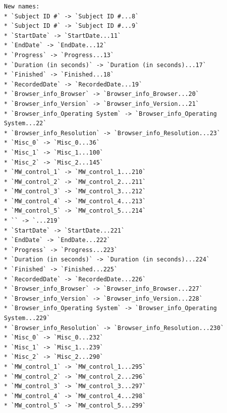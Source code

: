 \documentclass[
  letterpaper,
  DIV=11,
  numbers=noendperiod]{scrartcl}
\newenvironment{Shaded}{\begin{snugshade}}{\end{snugshade}}
\newcommand{\AttributeTok}[1]{\textcolor[rgb]{0.40,0.45,0.13}{#1}}
\newcommand{\DecValTok}[1]{\textcolor[rgb]{0.68,0.00,0.00}{#1}}
\newcommand{\FunctionTok}[1]{\textcolor[rgb]{0.28,0.35,0.67}{#1}}
\newcommand{\NormalTok}[1]{\textcolor[rgb]{0.00,0.23,0.31}{#1}}
\newcommand{\OtherTok}[1]{\textcolor[rgb]{0.00,0.23,0.31}{#1}}
\newcommand{\SpecialCharTok}[1]{\textcolor[rgb]{0.37,0.37,0.37}{#1}}
\newcommand{\StringTok}[1]{\textcolor[rgb]{0.13,0.47,0.30}{#1}}
\begin{document}
\begin{verbatim}
New names:
* `Subject ID #` -> `Subject ID #...8`
* `Subject ID #` -> `Subject ID #...9`
* `StartDate` -> `StartDate...11`
* `EndDate` -> `EndDate...12`
* `Progress` -> `Progress...13`
* `Duration (in seconds)` -> `Duration (in seconds)...17`
* `Finished` -> `Finished...18`
* `RecordedDate` -> `RecordedDate...19`
* `Browser_info_Browser` -> `Browser_info_Browser...20`
* `Browser_info_Version` -> `Browser_info_Version...21`
* `Browser_info_Operating System` -> `Browser_info_Operating System...22`
* `Browser_info_Resolution` -> `Browser_info_Resolution...23`
* `Misc_0` -> `Misc_0...36`
* `Misc_1` -> `Misc_1...100`
* `Misc_2` -> `Misc_2...145`
* `MW_control_1` -> `MW_control_1...210`
* `MW_control_2` -> `MW_control_2...211`
* `MW_control_3` -> `MW_control_3...212`
* `MW_control_4` -> `MW_control_4...213`
* `MW_control_5` -> `MW_control_5...214`
* `` -> `...219`
* `StartDate` -> `StartDate...221`
* `EndDate` -> `EndDate...222`
* `Progress` -> `Progress...223`
* `Duration (in seconds)` -> `Duration (in seconds)...224`
* `Finished` -> `Finished...225`
* `RecordedDate` -> `RecordedDate...226`
* `Browser_info_Browser` -> `Browser_info_Browser...227`
* `Browser_info_Version` -> `Browser_info_Version...228`
* `Browser_info_Operating System` -> `Browser_info_Operating System...229`
* `Browser_info_Resolution` -> `Browser_info_Resolution...230`
* `Misc_0` -> `Misc_0...232`
* `Misc_1` -> `Misc_1...239`
* `Misc_2` -> `Misc_2...290`
* `MW_control_1` -> `MW_control_1...295`
* `MW_control_2` -> `MW_control_2...296`
* `MW_control_3` -> `MW_control_3...297`
* `MW_control_4` -> `MW_control_4...298`
* `MW_control_5` -> `MW_control_5...299`
\end{verbatim}

\begin{Shaded}
\end{Shaded}
\end{document}
